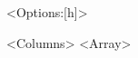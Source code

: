 \begin{table}<Options:[h]>
\centering
\caption{<Caption:nameless table>}
\label{<Label>}
\begin{tabular}{<Columns>}
<Array>
\end{tabular}
\end{table}
